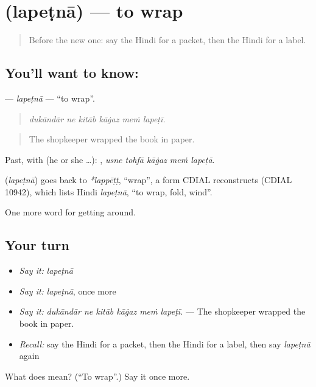 \section[\texorpdfstring{\hi{लपेटना} (lapeṭnā)}{लपेटना (lapeṭnā)}]{ (lapeṭnā) — to wrap}

\label{lesson:HI-C432-lapetna}



\begin{quote}
Before the new one: say the Hindi for a packet, then the Hindi for a label.
\end{quote}

\subsection*{You'll want to know: }
\textbf{} — \emph{lapeṭnā} — \textquotedblleft{}to wrap\textquotedblright{}.

\begin{quote}
     
\end{quote}

\begin{quote}
\emph{dukāndār ne kitāb kāġaz meṁ lapeṭī.}
\end{quote}

\begin{quote}
The shopkeeper wrapped the book in paper.
\end{quote}

Past, with  (he or she …):     , \emph{usne tohfā kāġaz meṁ lapeṭā}.

\begin{cousinweb}
\textbf{} (\emph{lapeṭnā}) goes back to \emph{*lappēṭṭ}, \textquotedblleft{}wrap\textquotedblright{}, a form CDIAL reconstructs (CDIAL 10942), which lists Hindi \emph{lapeṭnā}, \textquotedblleft{}to wrap, fold, wind\textquotedblright{}.
\end{cousinweb}

\begin{grammarlens}[title={What you've built}]
One more word for getting around.
\end{grammarlens}

\subsection*{Your turn}
\begin{itemize}
\raggedright
  \item \emph{Say it:} \emph{lapeṭnā}
  \item \emph{Say it:} \emph{lapeṭnā}, once more
  \item \emph{Say it:} \emph{dukāndār ne kitāb kāġaz meṁ lapeṭī.} — The shopkeeper wrapped the book in paper.
  \item \emph{Recall:} say the Hindi for a packet, then the Hindi for a label, then say \emph{lapeṭnā} again
\end{itemize}

\begin{tcolorbox}[breakable,colback=teal!4,colframe=teal!35!black,title={Before you move on}]
What does  mean? (\textquotedblleft{}To wrap\textquotedblright{}.) Say it once more.
\end{tcolorbox}
